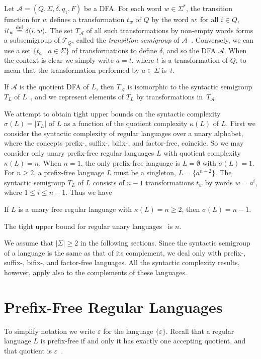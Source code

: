 \documentclass{llncs}
\renewcommand{\le}{\leqslant}
\renewcommand{\ge}{\geqslant}
\newcommand{\eps}{\varepsilon}
\newcommand{\Sig}{\Sigma}
\newcommand{\defeq}{\stackrel{\rm def}{=}}
\newcommand{\cA}{{\mathcal A}}
\newcommand{\cT}{{\mathcal T}}
\begin{document}
Let $\cA = (Q, \Sig, \delta, q_1, F)$ be a DFA. For each word $w \in \Sig^*$, the transition function for $w$ defines a transformation $t_w$ of $Q$ by the word $w$: for all $i \in Q$, 
$it_w \defeq \delta(i, w).$ 
The set $T_{\cA}$ of all such transformations by non-empty words forms a subsemigroup of $\cT_Q$, called the \emph{transition semigroup} of $\cA$~\cite{Pin97}. 
Conversely, we can use a set  $\{t_a \mid a \in \Sig\}$ of transformations to define $\delta$, and so the DFA $\cA$. When the context is clear we simply write $a = t$, where $t$ is a transformation of $Q$, to mean that the transformation performed by $a \in \Sig$ is~$t$.

If  $\cA$ is the quotient DFA of $L$, then $T_{\cA}$ is isomorphic to the syntactic semigroup $T_L$ of $L$~\cite{McNP71}, and we represent elements of $T_L$ by transformations in~$T_{\cA}$. 

We attempt to obtain tight upper bounds on the syntactic complexity $\sigma(L) = |T_L|$ of $L$ as a function of the quotient complexity $\kappa(L)$ of $L$.
First we consider the syntactic complexity of regular languages over a unary alphabet, where the  concepts prefix-, suffix-, bifix-, and factor-free, coincide. So we may consider only unary prefix-free regular languages $L$ with quotient complexity $\kappa(L) = n$. When $n = 1$, the only prefix-free language is $L = \emptyset$ with $\sigma(L) = 1$. For $n \ge 2$, a prefix-free language $L$ must be a singleton, $L = \{a^{n-2}\}$. The syntactic semigroup $T_L$ of $L$ consists of $n-1$ transformations $t_w$ by words $w = a^i$, where $1 \le i \le n-1$. Thus we have 

\begin{proposition}
If $L$ is a unary free regular language with $\kappa(L) = n \ge 2$, then $\sigma(L) = n-1$.
\end{proposition}


The tight upper bound for regular unary languages~\cite{HoKo04} is $n$. 

We assume that $|\Sig| \ge 2$ in the following sections. 
Since the syntactic semigroup of a language is the same as that of its complement, we deal only with prefix-, suffix-, bifix-, and factor-free languages. All the syntactic complexity results, however, apply also to the complements of these languages.
\goodbreak

\section{Prefix-Free Regular Languages}\label{sec:pf}
To simplify notation we write $\eps$ for the language $\{\eps\}$. Recall that a regular language $L$ is prefix-free if and only it has exactly one accepting quotient, and that quotient is $\eps$~\cite{HSW09}.
\end{document}
